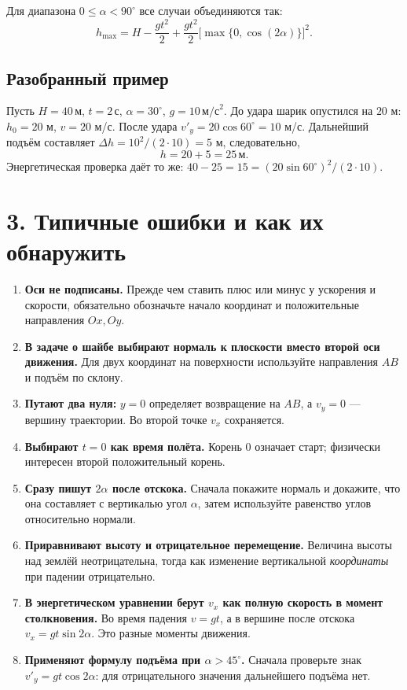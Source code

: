 \documentclass[a4paper,12pt]{article}
\newcommand{\secstyle}[1]{\section*{\textcolor{darkaccent}{#1}}}
\newcommand{\smallhead}[1]{\subsection*{\textcolor{darkaccent}{#1}}}
\begin{document}
Для диапазона \(0\le\alpha<90^\circ\) все случаи объединяются так:
\[
\boxed{h_{\max}=H-\frac{gt^2}{2}+\frac{gt^2}{2}\bigl[\max\{0,\cos(2\alpha)\}\bigr]^2.}
\]

\smallhead{Разобранный пример}
Пусть \(H=40\,\text{м}\), \(t=2\,\text{с}\), \(\alpha=30^\circ\), \(g=10\,\text{м/с}^2\). До удара шарик опустился на \(20\) м: \(h_0=20\) м, \(v=20\) м/с. После удара \(v'_y=20\cos60^\circ=10\) м/с. Дальнейший подъём составляет \(\Delta h=10^2/(2\cdot10)=5\) м, следовательно,
\[
\boxed{h=20+5=25\,\text{м}.}
\]
Энергетическая проверка даёт то же: \(40-25=15=(20\sin60^\circ)^2/(2\cdot10)\).

\clearpage
\secstyle{3. Типичные ошибки и как их обнаружить}
\begin{enumerate}[label=\textcolor{darkaccent}{\arabic*.}]
\item \textbf{Оси не подписаны.} Прежде чем ставить плюс или минус у ускорения и скорости, обязательно обозначьте начало координат и положительные направления \(Ox,Oy\).
\item \textbf{В задаче о шайбе выбирают нормаль к плоскости вместо второй оси движения.} Для двух координат на поверхности используйте направления \(AB\) и подъём по склону.
\item \textbf{Путают два нуля:} \(y=0\) определяет возвращение на \(AB\), а \(v_y=0\) --- вершину траектории. Во второй точке \(v_x\) сохраняется.
\item \textbf{Выбирают \(t=0\) как время полёта.} Корень \(0\) означает старт; физически интересен второй положительный корень.
\item \textbf{Сразу пишут \(2\alpha\) после отскока.} Сначала покажите нормаль и докажите, что она составляет с вертикалью угол \(\alpha\), затем используйте равенство углов относительно нормали.
\item \textbf{Приравнивают высоту и отрицательное перемещение.} Величина высоты над землёй неотрицательна, тогда как изменение вертикальной \emph{координаты} при падении отрицательно.
\item \textbf{В энергетическом уравнении берут \(v_x\) как полную скорость в момент столкновения.} Во время падения \(v=gt\), а в вершине после отскока \(v_x=gt\sin2\alpha\). Это разные моменты движения.
\item \textbf{Применяют формулу подъёма при \(\alpha>45^\circ\).} Сначала проверьте знак \(v'_y=gt\cos2\alpha\): для отрицательного значения дальнейшего подъёма нет.
\end{enumerate}
\end{document}
